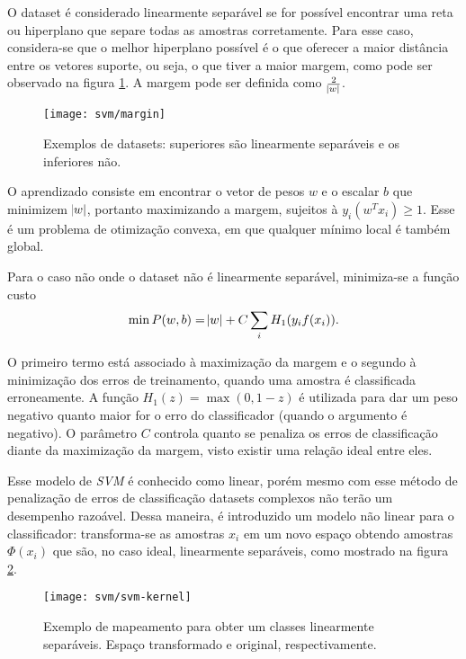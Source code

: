 O dataset é considerado linearmente separável se for possível encontrar uma reta ou hiperplano que separe todas as amostras corretamente. Para esse caso, considera-se que o melhor hiperplano possível é o que oferecer a maior distância entre os vetores suporte, ou seja, o que tiver a maior margem, como pode ser observado na figura \ref{fig:svm-margin}. A margem pode ser definida como $\frac{2}{\abs{w}}$.

\begin{figure}[h]
\centering
\texttt{[image: svm/margin]}
\caption{Exemplos de datasets: superiores são linearmente separáveis e os inferiores não.}
\label{fig:svm-margin}
\end{figure}

O aprendizado consiste em encontrar o vetor de pesos $w$ e o escalar $b$ que minimizem $\abs{w}$, portanto maximizando a margem, sujeitos à $y_i(w^T x_i) \geq 1$. Esse é um problema de otimização convexa, em que qualquer mínimo local é também global.

Para o caso não onde o dataset não é linearmente separável, minimiza-se a função custo 
\begin{equation*}
	\min P(w,b) = \abs{w} + C\sum_i H_1(y_i f(x_i)).
\end{equation*} 

O primeiro termo está associado à maximização da margem e o segundo à minimização dos erros de treinamento, quando uma amostra é classificada erroneamente. A função $H_1(z)=\max(0,1-z)$ é utilizada para dar um peso negativo quanto maior for o erro do classificador (quando o argumento é negativo). O parâmetro $C$ controla quanto se penaliza os erros de classificação diante da maximização da margem, visto existir uma relação ideal entre eles.

Esse modelo de \textit{SVM} é conhecido como linear, porém mesmo com esse método de penalização de erros de classificação datasets complexos não terão um desempenho razoável. Dessa maneira, é introduzido um modelo não linear para o classificador: transforma-se as amostras $x_i$ em um novo espaço obtendo amostras $\Phi(x_i)$ que são, no caso ideal, linearmente separáveis, como mostrado na figura \ref{fig:svm-kernel}.

\begin{figure}[h]
\centering
\texttt{[image: svm/svm-kernel]}
\caption{Exemplo de mapeamento para obter um classes linearmente separáveis. Espaço transformado e original, respectivamente.}
\label{fig:svm-kernel}
\end{figure}

